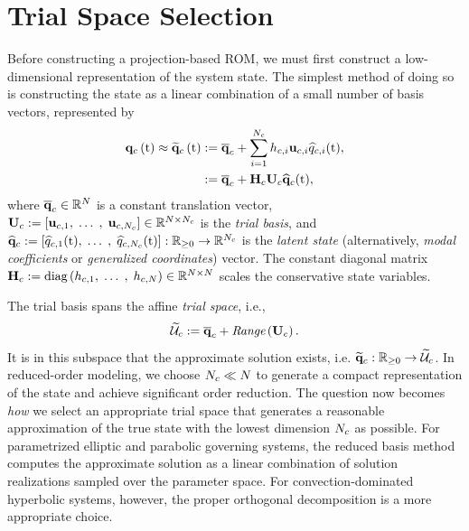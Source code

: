\section{Trial Space Selection}
%
Before constructing a projection-based ROM, we must first construct a low-dimensional representation of the system state. The simplest method of doing so is constructing the state as a linear combination of a small number of basis vectors, represented by
%
\begin{equation}\label{eq:consSolApprox}
    \begin{aligned}
        \consFunc{\timeVar} \approx \consFuncRom{\timeVar} &\defEq \consVecCent + \sum_{\dummyIdx=1}^{\numConsModes} \consScaleVar{\dummyIdx} \consTrialVecIdx \consVarCoefIdx (\timeVar), \\
        &\defEq \consAffineMap(\timeVar),
    \end{aligned}
\end{equation}
%
where $\mathbf{\overline{q}}_{c} \in \mathbb{R}^{N}$ is a constant translation vector, $\consTrial \defEq \left[\consTrialVec{1}, \; \hdots \;, \; \consTrialVec{\numConsModes}\right] \inRTwo{\numDOF}{\numConsModes}$ is the \textit{trial basis}, and $\mathbf{\widehat{q}}_{c} := \left[\widehat{q}_{c,1}(\text{t}), \;\hdots \;, \;\widehat{q}_{c,N_c}(\text{t})\right]: \mathbb{R}_{\ge 0} \rightarrow \mathbb{R}^{N_c}$ is the \textit{latent state} (alternatively, \textit{modal coefficients} or \textit{generalized coordinates}) vector. The constant diagonal matrix $\consScale \defEq \text{diag}\left(\consScaleVar{1}, \; \hdots \;, \; \consScaleVar{\numDOF}\right) \inRTwo{\numDOF}{\numDOF}$ scales the conservative state variables.

The trial basis spans the affine \textit{trial space}, i.e.,
%
\begin{equation}
    \consTrialSpace \defEq \consVecCent + \textit{Range}\left(\consTrial\right).
\end{equation}
%
It is in this subspace that the approximate solution exists, i.e. $\funcMap{\consVecRom}{\nonnegReals}{\consTrialSpace}$. In reduced-order modeling, we choose $N_c \ll N$ to generate a compact representation of the state and achieve significant order reduction. The question now becomes \textit{how} we select an appropriate trial space that generates a reasonable approximation of the true state with the lowest dimension $N_c$ as possible. For parametrized elliptic and parabolic governing systems, the reduced basis method computes the approximate solution as a linear combination of solution realizations sampled over the parameter space. For convection-dominated hyperbolic systems, however, the proper orthogonal decomposition is a more appropriate choice.

